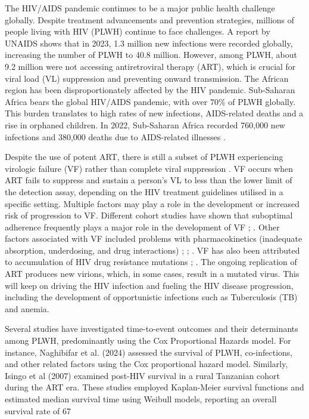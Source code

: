 \documentclass[10pt]{NSP1}
\begin{document}
The HIV/AIDS pandemic continues to be a major public health challenge globally. Despite treatment advancements and prevention strategies, millions of people living with HIV (PLWH) continue to face challenges. A report by UNAIDS \cite{UNAIDS2024}shows that in 2023, 1.3 million new infections were recorded globally, increasing the number of PLWH to 40.8 million. However, among PLWH, about 9.2 million were not accessing antiretroviral therapy (ART), which is crucial for viral load (VL) suppression and preventing onward transmission. The African region has been disproportionately affected by the HIV pandemic. Sub-Saharan Africa bears the global HIV/AIDS pandemic, with over 70\% of PLWH globally. This burden translates to high rates of new infections, AIDS-related deaths and a rise in orphaned children. In 2022, Sub-Saharan Africa recorded 760,000 new infections and 380,000 deaths due to AIDS-related illnesses \cite{WHO2023}.

Despite the use of potent ART, there is still a subset of PLWH experiencing virologic failure (VF) rather than complete viral suppression \cite{Bareng2024}. VF occurs when ART fails to suppress and sustain a person's VL to less than the lower limit of the detection assay, depending on the HIV treatment guidelines utilised in a specific setting. Multiple factors may play a role in the development or increased risk of progression to VF. Different cohort studies have shown that suboptimal adherence frequently plays a major role in the development of VF \cite{Daltro2023}; \cite{Ekstrand2011}. Other factors associated with VF included problems with pharmacokinetics (inadequate absorption, underdosing, and drug interactions) \cite{Bulage2017}; \cite{Chun2010}; \cite{Tobin2005}. VF has also been attributed to accumulation of  HIV drug resistance mutations \cite{Manakhov2025}; \cite{Li2021}. The ongoing replication of ART produces new virions, which, in some cases, result in a mutated virus. This will keep on driving the HIV infection and fueling the HIV disease progression, including the development of opportunistic infections such as Tuberculosis (TB) and anemia. 

Several studies have investigated time-to-event outcomes and their determinants among PLWH, predominantly using the Cox Proportional Hazards model. For instance, Naghibifar et al. (2024) assessed the survival of PLWH, co-infections, and other related factors using the Cox proportional hazard model. Similarly, Isingo et al (2007) examined post-HIV survival in a rural Tanzanian cohort during the ART era. These studies employed Kaplan-Meier survival functions and estimated median survival time using Weibull models, reporting an overall survival rate of 67%
\end{document}
